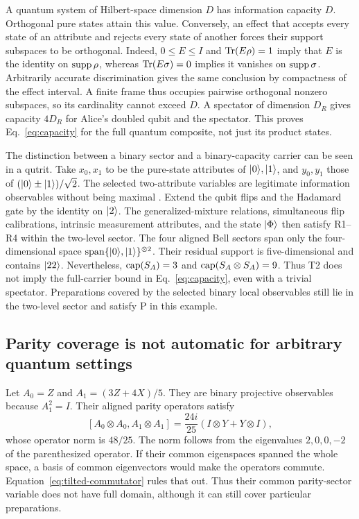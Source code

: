 A quantum system of Hilbert-space dimension $D$ has information capacity $D$. Orthogonal pure states attain this value. Conversely, an effect that accepts every state of an attribute and rejects every state of another forces their support subspaces to be orthogonal. Indeed, $0\leq E\leq I$ and $\operatorname{Tr}(E\rho)=1$ imply that $E$ is the identity on $\operatorname{supp}\rho$, whereas $\operatorname{Tr}(E\sigma)=0$ implies it vanishes on $\operatorname{supp}\sigma$. Arbitrarily accurate discrimination gives the same conclusion by compactness of the effect interval. A finite frame thus occupies pairwise orthogonal nonzero subspaces, so its cardinality cannot exceed $D$. A spectator of dimension $D_R$ gives capacity $4D_R$ for Alice's doubled qubit and the spectator. This proves Eq.~\eqref{eq:capacity} for the full quantum composite, not just its product states.

The distinction between a binary sector and a binary-capacity carrier can be seen in a qutrit. Take $x_0,x_1$ to be the pure-state attributes of $\lvert 0\rangle,\lvert 1\rangle$, and $y_0,y_1$ those of $(\lvert 0\rangle\pm\lvert 1\rangle)/\sqrt2$. The selected two-attribute variables are legitimate information observables without being maximal \cite[Sec.~7, p.~19]{cti}. Extend the qubit flips and the Hadamard gate by the identity on $\lvert 2\rangle$. The generalized-mixture relations, simultaneous flip calibrations, intrinsic measurement attributes, and the state $\lvert \Phi\rangle$ then satisfy R1--R4 within the two-level sector. The four aligned Bell sectors span only the four-dimensional space $\operatorname{span}\{\lvert 0\rangle,\lvert 1\rangle\}^{\otimes2}$. Their residual support is five-dimensional and contains $\lvert 22\rangle$. Nevertheless, $\operatorname{cap}(S_A)=3$ and $\operatorname{cap}(S_A\otimes S_A)=9$. Thus T2 does not imply the full-carrier bound in Eq.~\eqref{eq:capacity}, even with a trivial spectator. Preparations covered by the selected binary local observables still lie in the two-level sector and satisfy P in this example.

\subsection{Parity coverage is not automatic for arbitrary quantum settings}
Let $A_0=Z$ and $A_1=(3Z+4X)/5$. They are binary projective observables because $A_1^2=I$. Their aligned parity operators satisfy
\begin{equation}\label{eq:tilted-commutator}
 [A_0\otimes A_0,A_1\otimes A_1]
 =\frac{24i}{25}(I\otimes Y+Y\otimes I),
\end{equation}
whose operator norm is $48/25$. The norm follows from the eigenvalues $2,0,0,-2$ of the parenthesized operator. If their common eigenspaces spanned the whole space, a basis of common eigenvectors would make the operators commute. Equation~\eqref{eq:tilted-commutator} rules that out. Thus their common parity-sector variable does not have full domain, although it can still cover particular preparations.

